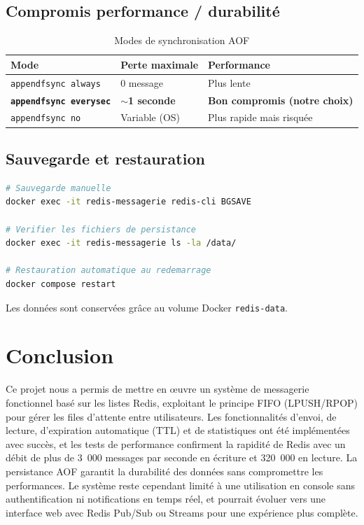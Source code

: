 \documentclass[12pt,a4paper]{article}
\begin{document}
\subsection{Compromis performance / durabilit\'e}

\begin{table}[H]
\centering
\begin{tabular}{|l|l|l|}
\hline
\textbf{Mode} & \textbf{Perte maximale} & \textbf{Performance} \\
\hline
\texttt{appendfsync always} & 0 message & Plus lente \\
\textbf{\texttt{appendfsync everysec}} & \textbf{$\sim$1 seconde} & \textbf{Bon compromis (notre choix)} \\
\texttt{appendfsync no} & Variable (OS) & Plus rapide mais risqu\'ee \\
\hline
\end{tabular}
\caption{Modes de synchronisation AOF}
\end{table}

\subsection{Sauvegarde et restauration}

\begin{lstlisting}[language=bash]
# Sauvegarde manuelle
docker exec -it redis-messagerie redis-cli BGSAVE

# Verifier les fichiers de persistance
docker exec -it redis-messagerie ls -la /data/

# Restauration automatique au redemarrage
docker compose restart
\end{lstlisting}

Les donn\'ees sont conserv\'ees gr\^ace au volume Docker \texttt{redis-data}.

\section{Conclusion}

Ce projet nous a permis de mettre en \oe uvre un syst\`eme de messagerie fonctionnel bas\'e sur les listes Redis, exploitant le principe FIFO (LPUSH/RPOP) pour g\'erer les files d'attente entre utilisateurs. Les fonctionnalit\'es d'envoi, de lecture, d'expiration automatique (TTL) et de statistiques ont \'et\'e impl\'ement\'ees avec succ\`es, et les tests de performance confirment la rapidit\'e de Redis avec un d\'ebit de plus de 3~000 messages par seconde en \'ecriture et 320~000 en lecture. La persistance AOF garantit la durabilit\'e des donn\'ees sans compromettre les performances. Le syst\`eme reste cependant limit\'e \`a une utilisation en console sans authentification ni notifications en temps r\'eel, et pourrait \'evoluer vers une interface web avec Redis Pub/Sub ou Streams pour une exp\'erience plus compl\`ete.
\end{document}
